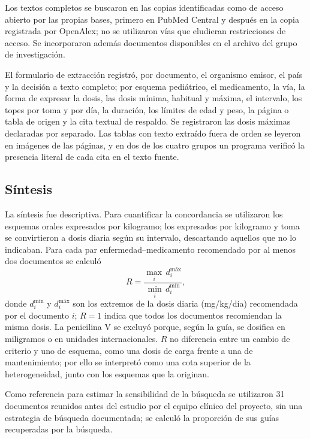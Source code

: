 \documentclass[11pt,a4paper]{article}
\begin{document}
Los textos completos se buscaron en las copias identificadas como de acceso abierto por las propias bases, primero en PubMed Central y después en la copia registrada por OpenAlex; no se utilizaron vías que eludieran restricciones de acceso. Se incorporaron además documentos disponibles en el archivo del grupo de investigación.

El formulario de extracción registró, por documento, el organismo emisor, el país y la decisión a texto completo; por esquema pediátrico, el medicamento, la vía, la forma de expresar la dosis, las dosis mínima, habitual y máxima, el intervalo, los topes por toma y por día, la duración, los límites de edad y peso, la página o tabla de origen y la cita textual de respaldo. Se registraron las dosis máximas declaradas por separado. Las tablas con texto extraído fuera de orden se leyeron en imágenes de las páginas, y en dos de los cuatro grupos un programa verificó la presencia literal de cada cita en el texto fuente.

\subsection{Síntesis}

La síntesis fue descriptiva. Para cuantificar la concordancia se utilizaron los esquemas orales expresados por kilogramo; los expresados por kilogramo y toma se convirtieron a dosis diaria según su intervalo, descartando aquellos que no lo indicaban. Para cada par enfermedad--medicamento recomendado por al menos dos documentos se calculó
\begin{equation}
R = \frac{\max_i \, d_i^{\text{máx}}}{\min_i \, d_i^{\text{mín}}},
\label{eq:razon}
\end{equation}
donde $d_i^{\text{mín}}$ y $d_i^{\text{máx}}$ son los extremos de la dosis diaria (mg/kg/día) recomendada por el documento $i$; $R = 1$ indica que todos los documentos recomiendan la misma dosis. La penicilina V se excluyó porque, según la guía, se dosifica en miligramos o en unidades internacionales. $R$ no diferencia entre un cambio de criterio y uno de esquema, como una dosis de carga frente a una de mantenimiento; por ello se interpretó como una cota superior de la heterogeneidad, junto con los esquemas que la originan.

Como referencia para estimar la sensibilidad de la búsqueda se utilizaron 31 documentos reunidos antes del estudio por el equipo clínico del proyecto, sin una estrategia de búsqueda documentada; se calculó la proporción de sus guías recuperadas por la búsqueda.
\end{document}
